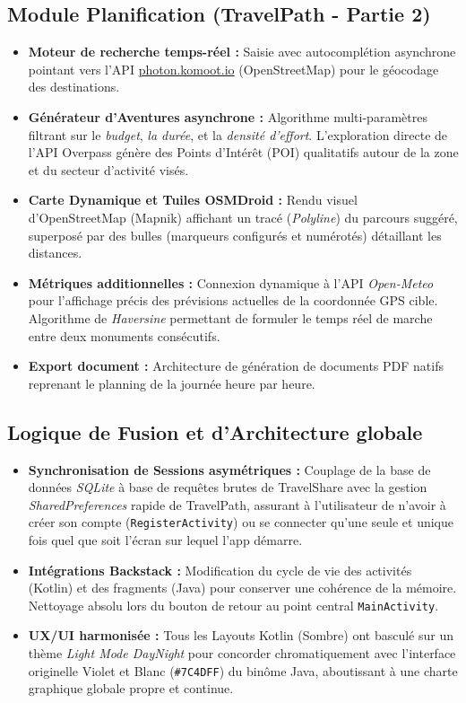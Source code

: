 \documentclass[11pt,a4paper]{article}
\begin{document}
\subsection{Module Planification (TravelPath - Partie 2)}
\begin{itemize}[label=\textcolor{primary}{\textbullet}]
    \item \textbf{Moteur de recherche temps-réel :} Saisie avec autocomplétion asynchrone pointant vers l'API \url{photon.komoot.io} (OpenStreetMap) pour le géocodage des destinations.
    \item \textbf{Générateur d'Aventures asynchrone :} Algorithme multi-paramètres filtrant sur le \textit{budget}, \textit{la durée}, et la \textit{densité d'effort}. L'exploration directe de l'API Overpass génère des Points d'Intérêt (POI) qualitatifs autour de la zone et du secteur d'activité visés.
    \item \textbf{Carte Dynamique et Tuiles OSMDroid :} Rendu visuel d'OpenStreetMap (Mapnik) affichant un tracé (\textit{Polyline}) du parcours suggéré, superposé par des bulles (marqueurs configurés et numérotés) détaillant les distances.
    \item \textbf{Métriques additionnelles :} Connexion dynamique à l'API \textit{Open-Meteo} pour l'affichage précis des prévisions actuelles de la coordonnée GPS cible. Algorithme de \textit{Haversine} permettant de formuler le temps réel de marche entre deux monuments consécutifs.
    \item \textbf{Export document :} Architecture de génération de documents PDF natifs reprenant le planning de la journée heure par heure.
\end{itemize}

\subsection{Logique de Fusion et d'Architecture globale}
\begin{itemize}[label=\textcolor{primary}{\textbullet}]
    \item \textbf{Synchronisation de Sessions asymétriques :} Couplage de la base de données \textit{SQLite} à base de requêtes brutes de TravelShare avec la gestion \textit{SharedPreferences} rapide de TravelPath, assurant à l'utilisateur de n'avoir à créer son compte (\texttt{RegisterActivity}) ou se connecter qu'une seule et unique fois quel que soit l'écran sur lequel l'app démarre.
    \item \textbf{Intégrations Backstack :} Modification du cycle de vie des activités (Kotlin) et des fragments (Java) pour conserver une cohérence de la mémoire. Nettoyage absolu lors du bouton de retour au point central \texttt{MainActivity}.
    \item \textbf{UX/UI harmonisée :} Tous les Layouts Kotlin (Sombre) ont basculé sur un thème \textit{Light Mode DayNight} pour concorder chromatiquement avec l'interface originelle Violet et Blanc (\texttt{\#7C4DFF}) du binôme Java, aboutissant à une charte graphique globale propre et continue.
\end{itemize}
\end{document}
